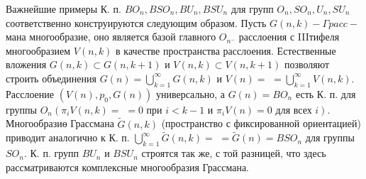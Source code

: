 \documentclass[10pt]{article}
\begin{document}
Важнейшие примеры К. п. $B O_{n}, B S O_{n}, B U_{n}, B S U_{n}$ для групп $O_{n}, S O_{n}, U_{n}, S U_{n}$ соответственно конструируются следующим образом. Пусть $G(n, k)-\Gamma p a c c-$ мана многообразие, оно является базой главного $O_{n^{-}}$ расслоения с IIIтифеля многообразием $V(n, k)$ в качестве пространства расслоения. Естественные вложения $G(n, k) \subset G(n, k+1)$ и $V(n, k) \subset V(n, k+1)$ позволяют строить объединения $G(n)=\bigcup_{k=1}^{\infty} G(n, k)$ и $V(n)=$ $=\bigcup_{k=1}^{\infty} V(n, k)$. Расслоение $\left(V(n), p_{0}, G(n)\right)$ универсально, а $G(n)=B O_{n}$ есть К. п. для группы $O_{n}\left(\pi_{i} V(n, k)=\right.$ $=0$ при $i<k-1$ и $\pi_{i} V(n)=0$ для всех $\left.i\right)$. Многообразиө Грассмана $\tilde{G}(n, k)$ (пространство с фиксированной ориентацией) приводит аналогично к К. п. $\bigcup_{k=1}^{\infty} \tilde{G}(n, k)=$ $=\tilde{G}(n)=B S O_{n}$ для группы $S O_{n}$. К. п. групп $B U_{n}$ и $B S U_{n}$ строятся так же, с той разницей, что здесь рассматриваются комплексные многообразия Грассмана.
\end{document}
